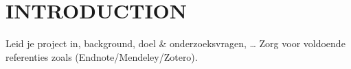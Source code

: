 \section{INTRODUCTION}
Leid je project in, background, doel \& onderzoeksvragen, \dots 
Zorg voor voldoende referenties zoals \cite{latex2e} \cite{latex:companion}  \cite{knuth:1984} (Endnote/Mendeley/Zotero).
